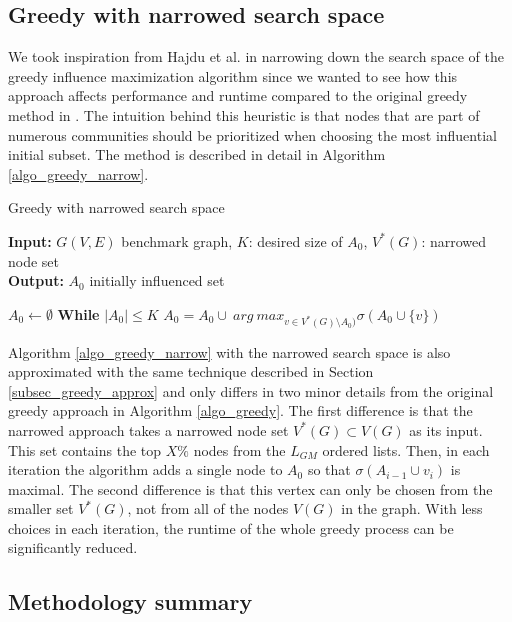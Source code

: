 \documentclass[pdflatex,sn-mathphys-ay]{sn-jnl}
\begin{document}
\subsection{Greedy with narrowed search space}\label{subsec_narrowed}

We took inspiration from Hajdu et al. \citep{evaluating} in narrowing down the search space of the greedy influence maximization algorithm since we wanted to see how this approach affects performance and runtime compared to the original greedy method in \citep{kempe}. The intuition behind this heuristic is that nodes that are part of numerous communities should be prioritized when choosing the most influential initial subset. The method is described in detail in Algorithm \ref{algo_greedy_narrow}.

\begin{algorithm}[ht]
\caption{Greedy with narrowed search space}
\label{algo_greedy_narrow}
\textbf{Input:} $G(V,E)$ benchmark graph, $K$: desired size of $A_0$, $V^*(G)$: narrowed node set
\\
\textbf{Output:} $A_{0}$ initially influenced set
\begin{algorithmic}[1]
    \State $A_0 \leftarrow \emptyset$
    \State \textbf{While} $|A_{0}| \leq K$
    \State \hspace{\algorithmicindent} $A_{0}=A_{0} \cup \ arg \ max_{v \in V^*(G) \setminus A_{0})} \sigma(A_{0} \cup \{v\})$
\end{algorithmic}
\end{algorithm}

Algorithm \ref{algo_greedy_narrow} with the narrowed search space is also approximated with the same technique described in Section \ref{subsec_greedy_approx} and only differs in two minor details from the original greedy approach in Algorithm \ref{algo_greedy}. The first difference is that the narrowed approach takes a narrowed node set $V^*(G) \subset V(G)$ as its input. This set contains the top $X\%$ nodes from the $L_{GM}$ ordered lists. Then, in each iteration the algorithm adds a single node to $A_{0}$ so that $\sigma(A_{i-1} \cup {v_i})$ is maximal. The second difference is that this vertex can only be chosen from the smaller set $V^*(G)$, not from all of the nodes $V(G)$ in the graph. With less choices in each iteration, the runtime of the whole greedy process can be significantly reduced.


\subsection{Methodology summary}\label{subsec_method_summ}
\end{document}
